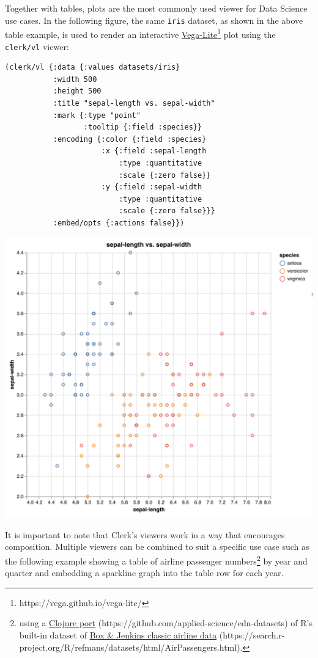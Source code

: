 \documentclass[sigconf,screen]{acmart}
\newcommand{\passthrough}[1]{#1}
\begin{document}
Together with tables, plots are the most commonly used viewer for Data Science use cases. In the following figure, the same \passthrough{\lstinline!iris!} dataset, as shown in the above table example, is used to render an interactive {\href{https://vega.github.io/vega-lite/}{Vega-Lite}\footnote{https://vega.github.io/vega-lite/}} plot using the \passthrough{\lstinline!clerk/vl!} viewer:

\begin{minipage}{\linewidth}
\begin{lstlisting}
(clerk/vl {:data {:values datasets/iris}
           :width 500
           :height 500
           :title "sepal-length vs. sepal-width"
           :mark {:type "point"
                  :tooltip {:field :species}}
           :encoding {:color {:field :species}
                      :x {:field :sepal-length
                          :type :quantitative
                          :scale {:zero false}}
                      :y {:field :sepal-width
                          :type :quantitative
                          :scale {:zero false}}}
           :embed/opts {:actions false}})
\end{lstlisting}
\end{minipage}

\includegraphics{images/anon-expr-5dtjeGHWCqJb9X8RfQtspB6Cyeo8Yv-result.png}

It is important to note that Clerk's viewers work in a way that encourages composition. Multiple viewers can be combined to suit a specific use case such as the following example showing a table of airline passenger numbers\footnote{using a {\href{https://github.com/applied-science/edn-datasets}{Clojure port} (https://github.com/applied-science/edn-datasets)} of R's built-in dataset of {\href{https://search.r-project.org/R/refmans/datasets/html/AirPassengers.html}{Box \& Jenkins classic airline data} (https://search.r-project.org/R/refmans/datasets/html/AirPassengers.html)}.} by year and quarter and embedding a sparkline graph into the table row for each year.
\end{document}
